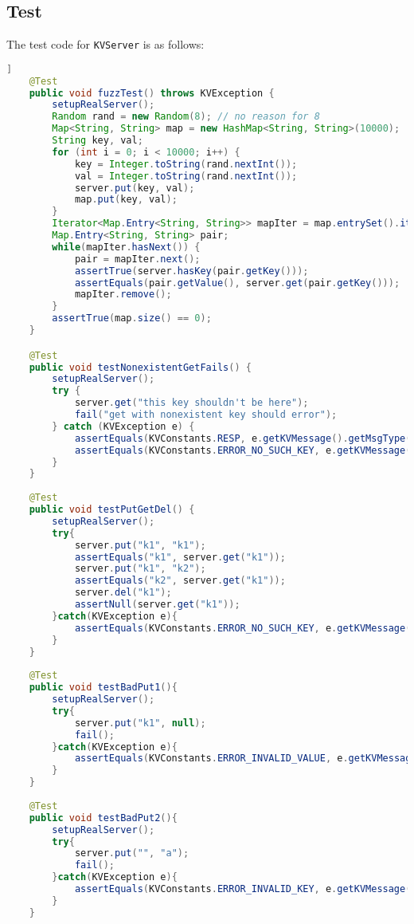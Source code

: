 \documentclass{article}
\begin{document}
\subsection{Test}
The test code for \texttt{KVServer} is as follows:
\begin{lstlisting}[language=java]]
    @Test
    public void fuzzTest() throws KVException {
        setupRealServer();
        Random rand = new Random(8); // no reason for 8
        Map<String, String> map = new HashMap<String, String>(10000);
        String key, val;
        for (int i = 0; i < 10000; i++) {
            key = Integer.toString(rand.nextInt());
            val = Integer.toString(rand.nextInt());
            server.put(key, val);
            map.put(key, val);
        }
        Iterator<Map.Entry<String, String>> mapIter = map.entrySet().iterator();
        Map.Entry<String, String> pair;
        while(mapIter.hasNext()) {
            pair = mapIter.next();
            assertTrue(server.hasKey(pair.getKey()));
            assertEquals(pair.getValue(), server.get(pair.getKey()));
            mapIter.remove();
        }
        assertTrue(map.size() == 0);
    }

    @Test
    public void testNonexistentGetFails() {
        setupRealServer();
        try {
            server.get("this key shouldn't be here");
            fail("get with nonexistent key should error");
        } catch (KVException e) {
            assertEquals(KVConstants.RESP, e.getKVMessage().getMsgType());
            assertEquals(KVConstants.ERROR_NO_SUCH_KEY, e.getKVMessage().getMessage());
        }
    }
    
    @Test
    public void testPutGetDel() {
    	setupRealServer();
    	try{
    		server.put("k1", "k1");
    		assertEquals("k1", server.get("k1"));
    		server.put("k1", "k2");
    		assertEquals("k2", server.get("k1"));
    		server.del("k1");
    		assertNull(server.get("k1"));
    	}catch(KVException e){
    		assertEquals(KVConstants.ERROR_NO_SUCH_KEY, e.getKVMessage().getMessage());
    	}
    }
    
    @Test
    public void testBadPut1(){
    	setupRealServer();
    	try{
    		server.put("k1", null);
    		fail();
    	}catch(KVException e){
    		assertEquals(KVConstants.ERROR_INVALID_VALUE, e.getKVMessage().getMessage());
    	}
    }
    
    @Test
    public void testBadPut2(){
    	setupRealServer();
    	try{
    		server.put("", "a");
    		fail();
    	}catch(KVException e){
    		assertEquals(KVConstants.ERROR_INVALID_KEY, e.getKVMessage().getMessage());
    	}
    }
    

\end{lstlisting}
\end{document}
